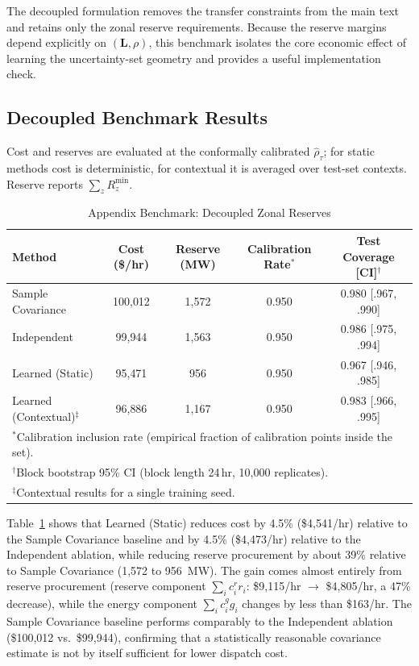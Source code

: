 \documentclass[11pt]{article}
\newcommand{\bL}{\bm{L}}
\theoremstyle{definition}
\begin{document}
The decoupled formulation removes the transfer constraints from the main text and retains only the zonal reserve requirements. Because the reserve margins depend explicitly on $(\bL,\rho)$, this benchmark isolates the core economic effect of learning the uncertainty-set geometry and provides a useful implementation check.

\subsection{Decoupled Benchmark Results}

Cost and reserves are evaluated at the conformally calibrated $\hat{\rho}_\tau$; for static methods cost is deterministic, for contextual it is averaged over test-set contexts. Reserve reports $\sum_z R_z^{\min}$.

\begin{table}[!t]
\caption{Appendix Benchmark: Decoupled Zonal Reserves}
\label{tab:decoupled}
\centering\footnotesize\setlength{\tabcolsep}{4pt}
\begin{tabular}{lcccc}
\toprule
\textbf{Method} & \textbf{Cost (\$/hr)} & \textbf{Reserve (MW)} & \textbf{Calibration Rate$^*$} & \textbf{Test Coverage [CI]$^\dagger$} \\
\midrule
Sample Covariance & 100{,}012 & 1{,}572 & 0.950 & 0.980 [.967, .990] \\
Independent & 99{,}944 & 1{,}563 & 0.950 & 0.986 [.975, .994] \\
Learned (Static) & 95{,}471 & 956 & 0.950 & 0.967 [.946, .985] \\
Learned (Contextual)$^\ddagger$ & 96{,}886 & 1{,}167 & 0.950 & 0.983 [.966, .995] \\
\bottomrule
\multicolumn{5}{l}{\footnotesize $^*$Calibration inclusion rate (empirical fraction of calibration points inside the set).} \\
\multicolumn{5}{l}{\footnotesize $^\dagger$Block bootstrap 95\% CI (block length 24\,hr, 10{,}000 replicates).} \\
\multicolumn{5}{l}{\footnotesize $^\ddagger$Contextual results for a single training seed.}
\end{tabular}
\end{table}

Table~\ref{tab:decoupled} shows that Learned (Static) reduces cost by 4.5\% (\$4{,}541/hr) relative to the Sample Covariance baseline and by 4.5\% (\$4{,}473/hr) relative to the Independent ablation, while reducing reserve procurement by about 39\% relative to Sample Covariance (1{,}572 to 956~MW). The gain comes almost entirely from reserve procurement (reserve component $\sum_i c_i^r r_i$: \$9{,}115/hr $\to$ \$4{,}805/hr, a 47\% decrease), while the energy component $\sum_i c_i^g g_i$ changes by less than \$163/hr. The Sample Covariance baseline performs comparably to the Independent ablation (\$100{,}012 vs.\ \$99{,}944), confirming that a statistically reasonable covariance estimate is not by itself sufficient for lower dispatch cost.
\end{document}
